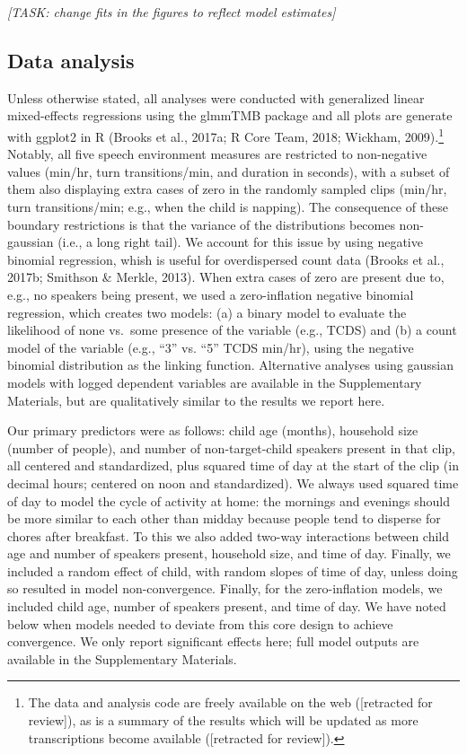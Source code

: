\documentclass[floatsintext,man]{apa6}
\theoremstyle{definition}
\theoremstyle{definition}
\theoremstyle{definition}
\theoremstyle{remark}
\begin{document}
\emph{{[}TASK: change fits in the figures to reflect model estimates{]}}

\subsection{Data analysis}\label{data-analysis}

Unless otherwise stated, all analyses were conducted with generalized
linear mixed-effects regressions using the glmmTMB package and all plots
are generate with ggplot2 in R (Brooks et al., 2017a; R Core Team, 2018;
Wickham, 2009).\footnote{The data and analysis code are freely available
  on the web ({[}retracted for review{]}), as is a summary of the
  results which will be updated as more transcriptions become available
  ({[}retracted for review{]}).} Notably, all five speech environment
measures are restricted to non-negative values (min/hr, turn
transitions/min, and duration in seconds), with a subset of them also
displaying extra cases of zero in the randomly sampled clips (min/hr,
turn transitions/min; e.g., when the child is napping). The consequence
of these boundary restrictions is that the variance of the distributions
becomes non-gaussian (i.e., a long right tail). We account for this
issue by using negative binomial regression, whish is useful for
overdispersed count data (Brooks et al., 2017b; Smithson \& Merkle,
2013). When extra cases of zero are present due to, e.g., no speakers
being present, we used a zero-inflation negative binomial regression,
which creates two models: (a) a binary model to evaluate the likelihood
of none vs.~some presence of the variable (e.g., TCDS) and (b) a count
model of the variable (e.g., \enquote{3} vs. \enquote{5} TCDS min/hr),
using the negative binomial distribution as the linking function.
Alternative analyses using gaussian models with logged dependent
variables are available in the Supplementary Materials, but are
qualitatively similar to the results we report here.

Our primary predictors were as follows: child age (months), household
size (number of people), and number of non-target-child speakers present
in that clip, all centered and standardized, plus squared time of day at
the start of the clip (in decimal hours; centered on noon and
standardized). We always used squared time of day to model the cycle of
activity at home: the mornings and evenings should be more similar to
each other than midday because people tend to disperse for chores after
breakfast. To this we also added two-way interactions between child age
and number of speakers present, household size, and time of day.
Finally, we included a random effect of child, with random slopes of
time of day, unless doing so resulted in model non-convergence. Finally,
for the zero-inflation models, we included child age, number of speakers
present, and time of day. We have noted below when models needed to
deviate from this core design to achieve convergence. We only report
significant effects here; full model outputs are available in the
Supplementary Materials.
\end{document}
